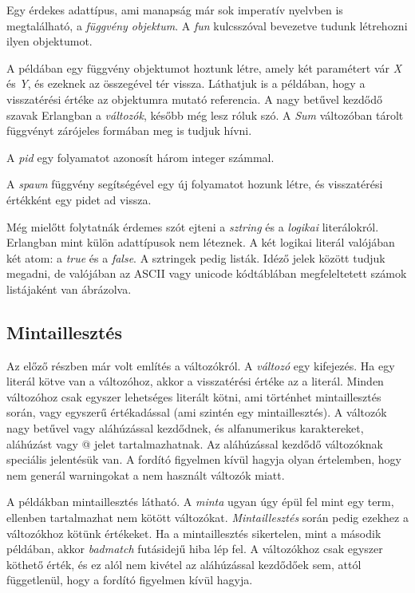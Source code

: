 

Egy érdekes adattípus, ami manapság már sok imperatív nyelvben is megtalálható, a \textit{függvény objektum}. A \textit{fun} kulcsszóval bevezetve tudunk létrehozni ilyen objektumot.



A példában egy függvény objektumot hoztunk létre, amely két paramétert vár \textit{X} és \textit{Y}, és ezeknek az összegével tér vissza. Láthatjuk is a példában, hogy a visszatérési értéke az objektumra mutató referencia. A nagy betűvel kezdődő szavak Erlangban a \textit{változók}, később még lesz róluk szó. A \textit{Sum} változóban tárolt függvényt zárójeles formában meg is tudjuk hívni.

A \textit{pid} egy folyamatot azonosít három integer számmal.



A \textit{spawn} függvény segítségével egy új folyamatot hozunk létre, és visszatérési értékként egy pidet ad vissza.

Még mielőtt folytatnák érdemes szót ejteni a \textit{sztring} és a \textit{logikai} literálokról. Erlangban mint külön adattípusok nem léteznek. A két logikai literál valójában két atom: a \textit{true} és a \textit{false}. A sztringek pedig listák. Idéző jelek között tudjuk megadni, de valójában az ASCII vagy unicode kódtáblában megfeleltetett számok listájaként van ábrázolva.

\subsection{Mintaillesztés}
Az előző részben már volt említés a változókról. A \textit{változó} egy kifejezés. Ha egy literál kötve van a változóhoz, akkor a visszatérési értéke az a literál. Minden változóhoz csak egyszer lehetséges literált kötni, ami történhet mintaillesztés során, vagy egyszerű értékadással (ami szintén egy mintaillesztés). A változók nagy betűvel vagy aláhúzással kezdődnek, és alfanumerikus karaktereket, aláhúzást vagy @ jelet tartalmazhatnak. Az aláhúzással kezdődő változóknak speciális jelentésük van. A fordító figyelmen kívül hagyja olyan értelemben, hogy nem generál warningokat a nem használt változók miatt.



A példákban mintaillesztés látható. A \textit{minta} ugyan úgy épül fel mint egy term, ellenben tartalmazhat nem kötött változókat. \textit{Mintaillesztés} során pedig ezekhez a változókhoz kötünk értékeket. Ha a mintaillesztés sikertelen, mint a második példában, akkor \textit{badmatch} futásidejű hiba lép fel. A változókhoz csak egyszer köthető érték, és ez alól nem kivétel az aláhúzással kezdődőek sem, attól függetlenül, hogy a fordító figyelmen kívül hagyja.

